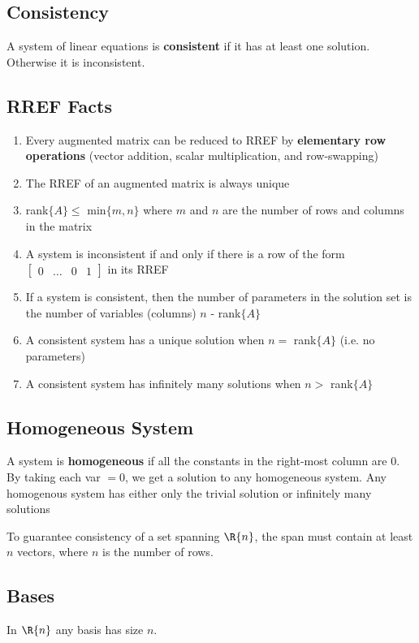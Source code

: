 \documentclass[12pt]{article}
\begin{document}
\subsection*{Consistency}
A system of linear equations is {\bf consistent} if it has at least one solution. Otherwise it is inconsistent.

\subsection*{RREF Facts}
\begin{enumerate}
\item Every augmented matrix can be reduced to RREF by {\bf elementary row operations} (vector addition, scalar multiplication, and row-swapping)
\item The RREF of an augmented matrix is always unique
\item rank$\{A\} \leq$ min$\{m,n\}$ where $m$ and $n$ are the number of rows and columns in the matrix
\item A system is inconsistent if and only if there is a row of the form $\begin{bmatrix}0&\dots&0&1\end{bmatrix}$ in its RREF
\item If a system is consistent, then the number of parameters in the solution set is the number of variables (columns) $n$ - rank$\{A\}$
\item A consistent system has a unique solution when $n =$ rank$\{A\}$ (i.e. no parameters)
\item A consistent system has infinitely many solutions when $n >$ rank$\{A\}$
\end{enumerate}

\subsection*{Homogeneous System}
A system is {\bf homogeneous} if all the constants in the right-most column are 0. By taking each var $= 0$, we get a solution to any homogeneous system. Any homogenous system has either only the trivial solution or infinitely many solutions

To guarantee consistency of a set spanning $\R{n}$, the span must contain at least $n$ vectors, where $n$ is the number of rows.

\subsection*{Bases}
In $\R{n}$ any basis has size $n$.
\end{document}
